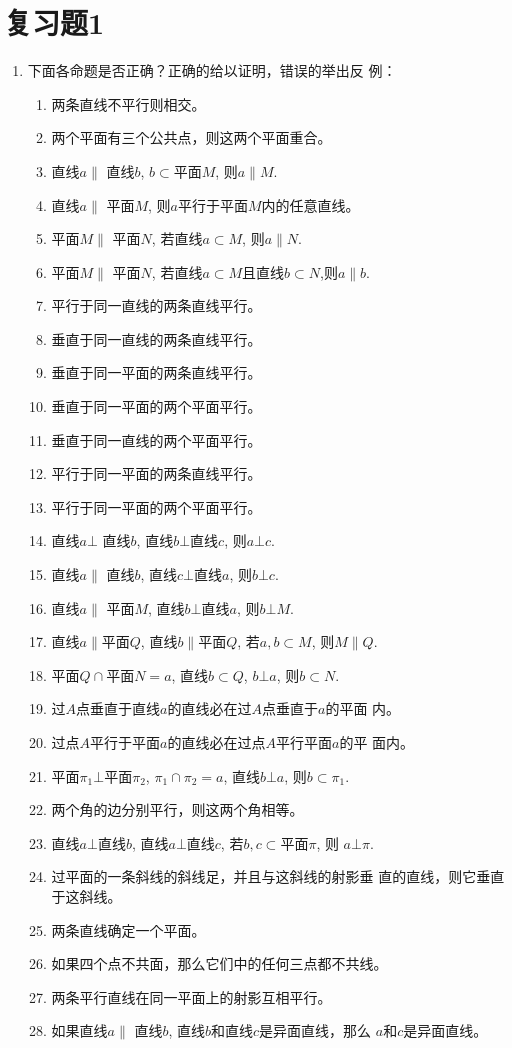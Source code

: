 \section*{复习题1}
\begin{enumerate}
    \item 下面各命题是否正确？正确的给以证明，错误的举出反
    例：
\begin{enumerate}[(1)]
\item 两条直线不平行则相交。
\item 两个平面有三个公共点，则这两个平面重合。
\item 直线$a\parallel$ 直线$b$, $b\subset$平面$M$, 则$a\parallel M$.
\item 直线$a\parallel$ 平面$M$, 则$a$平行于平面$M$内的任意直线。
\item 平面$M\parallel$ 平面$N$, 若直线$a\subset M$, 则$a\parallel N$.
\item 平面$M\parallel$ 平面$N$, 若直线$a\subset M$且直线$b\subset N$,则$a\parallel b$.
\item 平行于同一直线的两条直线平行。
\item 垂直于同一直线的两条直线平行。
\item 垂直于同一平面的两条直线平行。
\item 垂直于同一平面的两个平面平行。
\item 垂直于同一直线的两个平面平行。
\item 平行于同一平面的两条直线平行。
\item 平行于同一平面的两个平面平行。
\item 直线$a\bot$ 直线$b$, 直线$b\bot $直线$c$, 则$a\bot c$.
\item 直线$a\parallel$ 直线$b$, 直线$c\bot $直线$a$, 则$b\bot c$.
\item 直线$a\parallel$ 平面$M$, 直线$b\bot $直线$a$, 则$b\bot M$.
\item 直线$a\parallel $平面$Q$, 直线$b\parallel $平面$Q$, 若$a,b\subset M$, 则$M\parallel Q$.
\item 平面$Q\cap $平面$N=a$, 直线$b\subset Q$, $b\bot a$, 则$b\subset N$.
\item 过$A$点垂直于直线$a$的直线必在过$A$点垂直于$a$的平面
内。
\item 过点$A$平行于平面$a$的直线必在过点$A$平行平面$a$的平
面内。
\item 平面$\pi_1\bot $平面$\pi_2$, $\pi_1\cap \pi_2=a$, 直线$b\bot a$, 则$b\subset \pi_1$.
\item 两个角的边分别平行，则这两个角相等。
\item 直线$a\bot $直线$b$, 直线$a\bot $直线$c$, 若$b,c\subset $平面$\pi$, 则
$a\bot \pi$.
\item 过平面的一条斜线的斜线足，并且与这斜线的射影垂
直的直线，则它垂直于这斜线。
\item 两条直线确定一个平面。
\item 如果四个点不共面，那么它们中的任何三点都不共线。
\item 两条平行直线在同一平面上的射影互相平行。
\item 如果直线$a\parallel$ 直线$b$, 直线$b$和直线$c$是异面直线，那么
$a$和$c$是异面直线。
\end{enumerate}


\end{enumerate}
